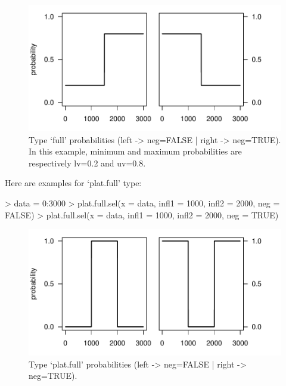 \documentclass[letterpaper, 12pt]{article}
\begin{document}
\begin{figure}[h]
\vspace{-20pt}
\begin{center}
\includegraphics{relation_sel-007}
\end{center}
\vspace{-30pt}
\caption{Type `full' probabilities (left -> neg=FALSE |  right -> neg=TRUE). In this example, minimum and maximum probabilities are respectively lv=0.2 and uv=0.8.}
\vspace{-10pt}
\label{fig3}
\end{figure}

\newpage

Here are examples for `plat.full' type:
\begin{Schunk}
\begin{Sinput}
> data = 0:3000
> plat.full.sel(x = data, infl1 = 1000, infl2 = 2000, neg = FALSE)
> plat.full.sel(x = data, infl1 = 1000, infl2 = 2000, neg = TRUE)
\end{Sinput}
\end{Schunk}
\begin{figure}[h]
\vspace{-20pt}
\begin{center}
\includegraphics{relation_sel-009}
\end{center}
\vspace{-30pt}
\caption{Type `plat.full' probabilities (left -> neg=FALSE |  right -> neg=TRUE).}
\vspace{-10pt}
\label{fig4}
\end{figure}
\end{document}
